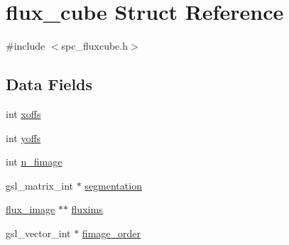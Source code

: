 \hypertarget{structflux__cube}{
\section{flux\_\-cube Struct Reference}
\label{structflux__cube}
}


{\ttfamily \#include $<$spc\_\-fluxcube.h$>$}\subsection*{Data Fields}
\begin{DoxyCompactItemize}
\item 
int \hyperlink{structflux__cube_aed8b9a141c8fd3f09022f27ca0f7d670}{xoffs}
\item 
int \hyperlink{structflux__cube_a0ac57c4e5fe235758efb4a7ca70e5d29}{yoffs}
\item 
int \hyperlink{structflux__cube_ad2a0926e5395663598768f3e09a14c69}{n\_\-fimage}
\item 
gsl\_\-matrix\_\-int $\ast$ \hyperlink{structflux__cube_a5003df20f749b61b1b9ba3818460ca0c}{segmentation}
\item 
\hyperlink{structflux__image}{flux\_\-image} $\ast$$\ast$ \hyperlink{structflux__cube_ab8326cc76fb87ffb4aa998f1f3a11cc7}{fluxims}
\item 
gsl\_\-vector\_\-int $\ast$ \hyperlink{structflux__cube_a4ec5facf29796f861f62aadd0661f946}{fimage\_\-order}
\end{DoxyCompactItemize}



